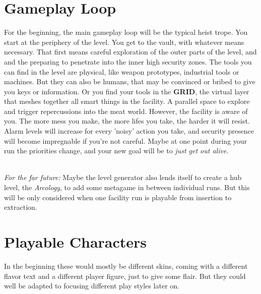 \documentclass[11pt,a4paper, twocolumn]{article}
\begin{document}
\section{Gameplay Loop}

For the beginning, the main gameplay loop will be the typical heist trope. You start at the periphery of the level.
You get to the vault, with whatever means necessary. That first means careful exploration of the outer parts of the
level, and and the preparing to penetrate into the inner high security zones.
The tools you can find in the level are physical, like weapon prototypes, industrial tools or machines. But they can
also be humans, that may be convinced or bribed to give you keys or information. Or you find your tools in the
\textbf{GRID}, the virtual layer that meshes together all smart things in the facility. A parallel space to explore
and trigger repercussions into the meat world.
However, the facility is aware of you. The more mess you make, the more lifes you take, the harder it will resist.
Alarm levels will increase for every 'noisy' action you take, and security presence will become impregnable if you're
not careful. Maybe at one point during your run the priorities change, and your new goal will be to
\textit{just get out alive}.\\  \

\textit{For the far future:} Maybe the level generator also lends itself to create a hub level, the \textit{Arcology}, to add
some metagame in between individual runs. But this will be only considered when one facility run is playable from
insertion to extraction.

\section{Playable Characters}

In the beginning these would mostly be different skins, coming with a different flavor text and a different player
figure, just to give some flair. But they could well be adapted to focusing different play styles later on.
\end{document}
